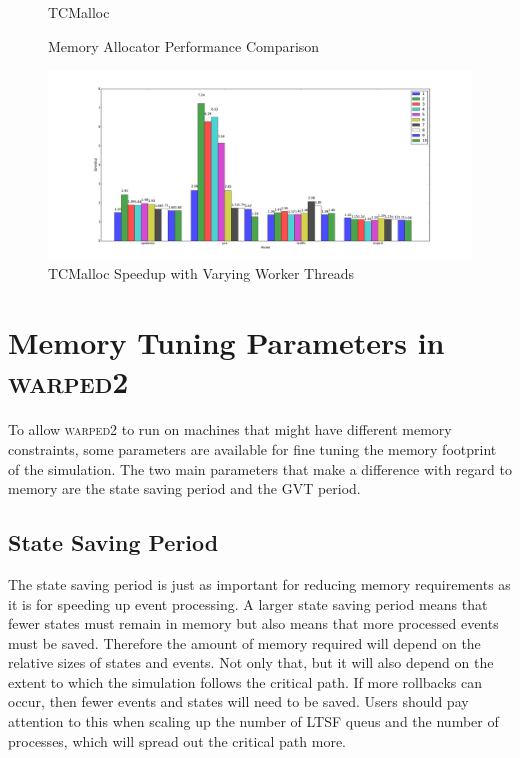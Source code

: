 \documentclass[11pt]{book}
\begin{document}
\begin{figure}
\begin{minipage}{.5\textwidth}
\begin{center}
      TCMalloc \\
    \end{center}
  \end{minipage}
  \caption{Memory Allocator Performance Comparison}\label{allocator_analysis}
\end{figure}

\begin{figure}
  \centering
  \includegraphics[width=\textwidth,quiet]{figs/memory_allocation/tcmalloc_speedup.pdf}
  \caption{TCMalloc Speedup with Varying Worker Threads}
\end{figure}

\section{Memory Tuning Parameters in \textsc{warped2}}

To allow \textsc{warped2} to run on machines that might have different memory constraints,
some parameters are available for fine tuning the memory footprint of the simulation. The
two main parameters that make a difference with regard to memory are the state saving period
and the GVT period.

\subsection{State Saving Period}

The state saving period is just as important for reducing memory requirements as it is for
speeding up event processing. A larger state saving period means that fewer states must remain
in memory but also means that more processed events must be saved. Therefore the amount of
memory required will depend on the relative sizes of states and events. Not only that, but it
will also depend on the extent to which the simulation follows the critical path. If more
rollbacks can occur, then fewer events and states will need to be saved. Users should pay attention
to this when scaling up the number of LTSF queus and the number of processes, which will spread
out the critical path more.
\end{document}
